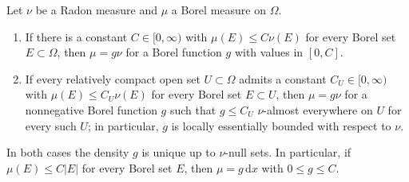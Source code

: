 \begin{lemma}\label{lem:dominated-measure-density}
Let $\nu$ be a Radon measure and $\mu$ a Borel measure on $\Omega$.
\begin{enumerate}
\item If there is a constant $C\in[0,\infty)$ with $\mu(E)\leq C\nu(E)$ for every Borel set $E\subset\Omega$, then $\mu=g\nu$ for a Borel function $g$ with values in $[0,C]$.
\item If every relatively compact open set $U\subset\Omega$ admits a constant $C_U\in[0,\infty)$ with $\mu(E)\leq C_U\nu(E)$ for every Borel set $E\subset U$, then $\mu=g\nu$ for a nonnegative Borel function $g$ such that $g\leq C_U$ $\nu$-almost everywhere on $U$ for every such $U$; in particular, $g$ is locally essentially bounded with respect to $\nu$.
\end{enumerate}
In both cases the density $g$ is unique up to $\nu$-null sets. In particular, if $\mu(E)\le C|E|$ for every Borel set $E$, then $\mu=g\,\mathrm dx$ with $0\le g\le C$.
\end{lemma}
